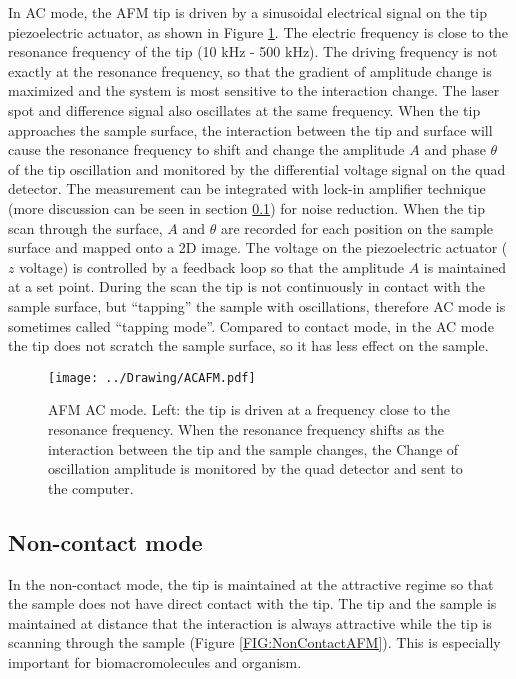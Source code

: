 \documentclass[pdftex, sectionletters]{pittetd}    %
\begin{document}
In AC mode, the AFM tip is driven by a sinusoidal electrical signal on the tip piezoelectric actuator, as shown in Figure \ref{FIG:ACAFM}. The electric frequency is close to the resonance frequency of the tip (10 kHz - 500 kHz). The driving frequency is not exactly at the resonance frequency, so that the gradient of amplitude change is maximized and the system is most sensitive to the interaction change. The laser spot and difference signal also oscillates at the same frequency. When the tip approaches the sample surface, the interaction between the tip and surface will cause the resonance frequency to shift and change the amplitude $A$ and phase $\theta$ of the tip oscillation and monitored by the differential voltage signal on the quad detector. The measurement can be integrated with lock-in amplifier technique (more discussion can be seen in section \ref{}) for noise reduction. When the tip scan through the surface, $A$ and $\theta$ are recorded for each position on the sample surface and mapped onto a 2D image. The voltage on the piezoelectric actuator ($z$ voltage) is controlled by a feedback loop so that the amplitude $A$ is maintained at a set point. During the scan the tip is not continuously in contact with the sample surface, but ``tapping'' the sample with oscillations, therefore AC mode is sometimes called ``tapping mode''. Compared to contact mode, in the AC mode the tip does not scratch the sample surface, so it has less effect on the sample. 

\begin{figure}[h!]
	\centering
	\texttt{[image: ../Drawing/ACAFM.pdf]}
	\caption{AFM AC mode. Left: the tip is driven at a frequency close to the resonance frequency. When the resonance frequency shifts as the interaction between the tip and the sample changes, the Change of oscillation amplitude is monitored by the quad detector and sent to the computer.}
	\label{FIG:ACAFM}
\end{figure}

\subsection{Non-contact mode}

In the non-contact mode, the tip is maintained at the attractive regime so that the sample does not have direct contact with the tip. The tip and the sample is maintained at distance that the interaction is always attractive while the tip is scanning through the sample (Figure \ref{FIG:NonContactAFM}). This is especially important for biomacromolecules and organism. 
\end{document}
